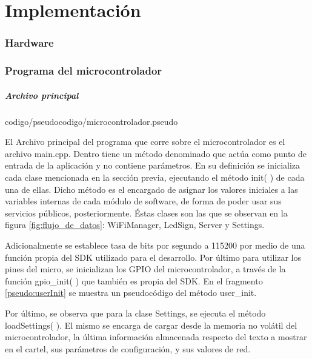 \part{Implementación}\label{part:implementacion}

\section{Hardware}

\section{Programa del microcontrolador} \label{sec:sw-implementacion}

\subsubsection{Archivo principal} \label{sec:archivo_principal}

 {codigo/pseudocodigo/microcontrolador.pseudo}

El Archivo principal del programa que corre sobre el microcontrolador es el archivo main.cpp.
Dentro tiene un método denominado  que actúa como punto de entrada de la aplicación y no contiene parámetros.
En su definición se inicializa cada clase mencionada en la sección previa, ejecutando el método init( ) de cada una de ellas.
Dicho método es el encargado de asignar los valores iniciales a las variables internas de cada módulo de software, de forma de poder usar sus servicios públicos, posteriormente.
Éstas clases son las que se observan en la figura \ref{fig:flujo_de_datos}: WiFiManager, LedSign, Server y Settings.

Adicionalmente se establece tasa de bits por segundo a 115200 por medio de una función propia del SDK utilizado para el desarrollo.
Por último para utilizar los pines del micro, se inicializan los GPIO del microcontrolador, a través de la función gpio\_init( ) que también es propia del SDK.
En el fragmento \ref{pseudo:userInit} se muestra un pseudocódigo del método user\_init\( \).

Por último, se observa que para la clase Settings, se ejecuta el método loadSettings( ).
El mismo se encarga de cargar desde la memoria no volátil del microcontrolador, la última información almacenada respecto del texto a mostrar en el cartel, sus parámetros de configuración, y sus valores de red. \newline

